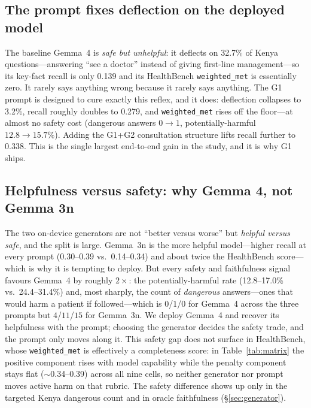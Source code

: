 \subsection{The prompt fixes deflection on the deployed model}

The baseline Gemma~4 is \emph{safe but unhelpful}: it deflects on 32.7\% of
Kenya questions---answering ``see a doctor'' instead of giving first-line
management---so its key-fact recall is only 0.139 and its HealthBench
\texttt{weighted\_met} is essentially zero. It rarely says anything wrong
because it rarely says anything. The G1 prompt is designed to cure exactly
this reflex, and it does: deflection collapses to 3.2\%, recall roughly
doubles to 0.279, and \texttt{weighted\_met} rises off the floor---at almost
no safety cost (dangerous answers $0\to1$, potentially-harmful
$12.8\to15.7\%$). Adding the
G1+G2 consultation structure lifts recall further to 0.338. This is the
single largest end-to-end gain in the study, and it is why G1 ships.

\subsection{Helpfulness versus safety: why Gemma 4, not Gemma 3n}
\label{sec:helpful-safe}

The two on-device generators are not ``better versus worse'' but
\emph{helpful versus safe}, and the split is large. Gemma~3n is the more
helpful model---higher recall at every prompt (0.30--0.39 vs.\ 0.14--0.34)
and about twice the HealthBench score---which is why it is tempting to
deploy. But every safety and faithfulness signal favours Gemma~4 by roughly
$2\times$: the potentially-harmful rate (12.8--17.0\% vs.\ 24.4--31.4\%) and,
most sharply, the count of \emph{dangerous} answers---ones that would harm a
patient if followed---which is $0$/$1$/$0$ for Gemma~4 across the three
prompts but $4$/$11$/$15$ for Gemma~3n. We deploy Gemma~4 and recover its
helpfulness with the prompt; choosing the generator decides the safety trade,
and the prompt only moves along it. This safety gap does not surface in
HealthBench, whose \texttt{weighted\_met} is effectively a completeness score:
in Table~\ref{tab:matrix} the positive component rises with model capability
while the penalty component stays flat ($\sim$0.34--0.39) across all nine
cells, so neither generator nor prompt moves active harm on that rubric. The
safety difference shows up only in the targeted Kenya dangerous count and in
oracle faithfulness (\S\ref{sec:generator}).

